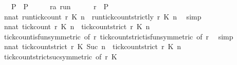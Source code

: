 \begin{isabellebody}
\ \ {\isacharparenleft}\ {\isacartoucheopen}{\isacharquery}P\ {\isacharequal}\ {\isacharquery}P{\isacharprime}{\isacartoucheclose}{\isacharparenright}\isanewline
%
\isadelimproof
%
\endisadelimproof
%
\isatagproof
{}\isamarkupfalse%
\isanewline
\ \ \isacommand{{\isacharbraceleft}}\isamarkupfalse%
\ \isamarkupfalse%
\ r{\isacharcolon}{\isacharcolon}{\isacartoucheopen}{\isacharprime}a\ run{\isacartoucheclose}\isanewline
\ \ \ \ \isamarkupfalse%
\ {\isacartoucheopen}r\ {\isasymin}\ {\isacharquery}P{\isacartoucheclose}\isanewline
\ \ \ \ \isamarkupfalse%
\ {\isacartoucheopen}{\isasymforall}n{\isacharcolon}{\isacharcolon}nat{\isachardot}\ {\isacharparenleft}run{\isacharunderscore}tick{\isacharunderscore}count\ r\ K\ n{\isacharparenright}\ {\isasymle}\ {\isacharparenleft}run{\isacharunderscore}tick{\isacharunderscore}count{\isacharunderscore}strictly\ r\ K\ n{\isacharparenright}{\isacartoucheclose}\ \isamarkupfalse%
\ simp\isanewline
\ \ \ \ \isamarkupfalse%
\ {}{\isacharcolon}{\isacartoucheopen}{\isasymforall}n{\isacharcolon}{\isacharcolon}nat{\isachardot}\ {\isacharparenleft}tick{\isacharunderscore}count\ r\ K\ n{\isacharparenright}\ {\isasymle}\ {\isacharparenleft}tick{\isacharunderscore}count{\isacharunderscore}strict\ r\ K\ n{\isacharparenright}{\isacartoucheclose}\isanewline
\ \ \ \ \ \ \isamarkupfalse%
\ tick{\isacharunderscore}count{\isacharunderscore}is{\isacharunderscore}fun{\isacharbrackleft}symmetric{\isacharcomma}\ of\ r{\isacharbrackright}\ tick{\isacharunderscore}count{\isacharunderscore}strict{\isacharunderscore}is{\isacharunderscore}fun{\isacharbrackleft}symmetric{\isacharcomma}\ of\ r{\isacharbrackright}\ \isamarkupfalse%
\ simp\isanewline
\ \ \ \ \isamarkupfalse%
\ {\isacartoucheopen}{\isasymforall}n{\isacharcolon}{\isacharcolon}nat{\isachardot}\ {\isacharparenleft}tick{\isacharunderscore}count{\isacharunderscore}strict\ r\ K\ {\isacharparenleft}Suc\ n{\isacharparenright}{\isacharparenright}\ {\isasymle}\ {\isacharparenleft}tick{\isacharunderscore}count{\isacharunderscore}strict\ r\ K\ n{\isacharparenright}{\isacartoucheclose}\isanewline
\ \ \ \ \ \ \isamarkupfalse%
\ tick{\isacharunderscore}count{\isacharunderscore}strict{\isacharunderscore}suc{\isacharbrackleft}symmetric{\isacharcomma}\ of\ {\isacartoucheopen}r{\isacartoucheclose}\ {\isacartoucheopen}K\ \isamarkupfalse%

\end{isabellebody}
